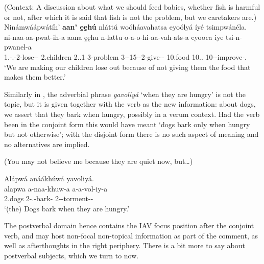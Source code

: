\documentclass[output=paper]{langscibook}
\begin{document}
\ea
\label{bkm:Ref95916636}
(Context: A discussion about what we should feed babies, whether fish is harmful or not, after which it is said that fish is not the problem, but we caretakers are.)\\
Ninámwáápwátíh’ \textbf{aan’ ḛḛhú} nláttú woóháavahatsa eyoólyá íyé tsimpwánéla.\\
\gll
ni-naa-aa-pwat-ih-a  aana  ḛḛhu  n-lattu    o-a-o-hi-aa-vah-ats-a  eyooca  iye  tsi-n-pwanel-a \\
1\PL{}.\SM{}-\PRS{}.\DJ{}-2\OM{}-lose-\CAUS{}-\FV{}  2.children  2.\POSS{}.1\PL{}  3-problem  3-\CONN{}-15-\NEG{}-2\OM{}-give-\PLUR{}-\FV{}  10.food  10.\DEM{}.\DIST{}  10-\PRS{}-improve-\FV{}.\REL{} \\
\glt
‘We are making our children lose out because of not giving them the food that makes them better.’\\

\z

Similarly in , the adverbial phrase \textit{yavoliyá} ‘when they are hungry’ is not the topic, but it is given together with the verb as the new information: about dogs, we assert that they bark when hungry, possibly in a verum context. Had the verb been in the conjoint form this would have meant ‘dogs bark only when hungry but not otherwise’; with the disjoint form there is no such aspect of meaning and no alternatives are implied.

\ea
\label{bkm:Ref95916824}
(You may not believe me because they are quiet now, but…)\\
\begin{xlist}
\exi{\DJ{}}
Alápwá anáákhúwá yavoliyá.\\
\gll
alapwa  a-naa-khuw-a  a-a-vol-iy-a\\
2.dogs  2\SM{}-\PRS{}.\DJ{}-bark-\FV{}  2\SM{}-\SIT{}-torment-\PASS{}-\FV{}\\
\glt
‘(the) Dogs bark when they are hungry.’\\

\end{xlist}


\z

The postverbal domain hence contains the IAV focus position after the conjoint verb, and may host non-focal non-topical information as part of the comment, as well as afterthoughts in the right periphery. There is a bit more to say about postverbal subjects, which we turn to now.
\end{document}

